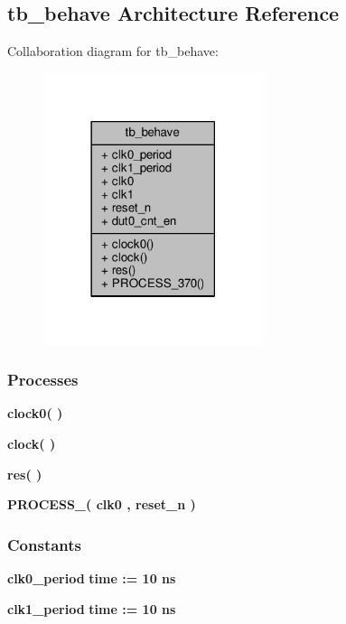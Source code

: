 \subsection{tb\+\_\+behave Architecture Reference}
\label{classsmpl__cnt__tb_1_1tb__behave}


Collaboration diagram for tb\+\_\+behave\+:\nopagebreak
\begin{figure}[H]
\begin{center}
\leavevmode
\includegraphics[width=182pt]{d3/db7/classsmpl__cnt__tb_1_1tb__behave__coll__graph}
\end{center}
\end{figure}
\subsubsection*{Processes}
 \begin{DoxyCompactItemize}
\item 
{\bf clock0}{\bfseries  (  )}
\item 
{\bf clock}{\bfseries  (  )}
\item 
{\bf res}{\bfseries  (  )}
\item 
{\bf P\+R\+O\+C\+E\+S\+S\+\_}{\bfseries  ( {\bfseries {\bfseries {\bf clk0}} \textcolor{vhdlchar}{ }} , {\bfseries {\bfseries {\bf reset\+\_\+n}} \textcolor{vhdlchar}{ }} )}
\end{DoxyCompactItemize}
\subsubsection*{Constants}
 \begin{DoxyCompactItemize}
\item 
{\bf clk0\+\_\+period} {\bfseries \textcolor{comment}{time}\textcolor{vhdlchar}{ }\textcolor{vhdlchar}{ }\textcolor{vhdlchar}{\+:}\textcolor{vhdlchar}{=}\textcolor{vhdlchar}{ }\textcolor{vhdlchar}{ }\textcolor{vhdlchar}{ } \textcolor{vhdldigit}{10} \textcolor{vhdlchar}{ }\textcolor{vhdlchar}{ns}\textcolor{vhdlchar}{ }} 
\item 
{\bf clk1\+\_\+period} {\bfseries \textcolor{comment}{time}\textcolor{vhdlchar}{ }\textcolor{vhdlchar}{ }\textcolor{vhdlchar}{\+:}\textcolor{vhdlchar}{=}\textcolor{vhdlchar}{ }\textcolor{vhdlchar}{ }\textcolor{vhdlchar}{ } \textcolor{vhdldigit}{10} \textcolor{vhdlchar}{ }\textcolor{vhdlchar}{ns}\textcolor{vhdlchar}{ }} 
\end{DoxyCompactItemize}
